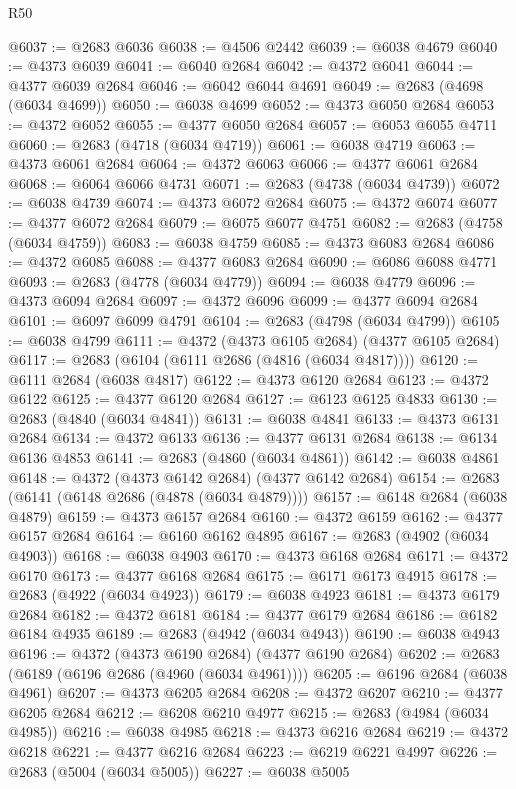 \begin{lexlean}{R50}
\begin{coremodule}
@6037 := @2683 @6036
@6038 := @4506 @2442
@6039 := @6038 @4679
@6040 := @4373 @6039
@6041 := @6040 @2684
@6042 := @4372 @6041
@6044 := @4377 @6039 @2684
@6046 := @6042 @6044 @4691
@6049 := @2683 (@4698 (@6034 @4699))
@6050 := @6038 @4699
@6052 := @4373 @6050 @2684
@6053 := @4372 @6052
@6055 := @4377 @6050 @2684
@6057 := @6053 @6055 @4711
@6060 := @2683 (@4718 (@6034 @4719))
@6061 := @6038 @4719
@6063 := @4373 @6061 @2684
@6064 := @4372 @6063
@6066 := @4377 @6061 @2684
@6068 := @6064 @6066 @4731
@6071 := @2683 (@4738 (@6034 @4739))
@6072 := @6038 @4739
@6074 := @4373 @6072 @2684
@6075 := @4372 @6074
@6077 := @4377 @6072 @2684
@6079 := @6075 @6077 @4751
@6082 := @2683 (@4758 (@6034 @4759))
@6083 := @6038 @4759
@6085 := @4373 @6083 @2684
@6086 := @4372 @6085
@6088 := @4377 @6083 @2684
@6090 := @6086 @6088 @4771
@6093 := @2683 (@4778 (@6034 @4779))
@6094 := @6038 @4779
@6096 := @4373 @6094 @2684
@6097 := @4372 @6096
@6099 := @4377 @6094 @2684
@6101 := @6097 @6099 @4791
@6104 := @2683 (@4798 (@6034 @4799))
@6105 := @6038 @4799
@6111 := @4372 (@4373 @6105 @2684) (@4377 @6105 @2684)
@6117 := @2683 (@6104 (@6111 @2686 (@4816 (@6034 @4817))))
@6120 := @6111 @2684 (@6038 @4817)
@6122 := @4373 @6120 @2684
@6123 := @4372 @6122
@6125 := @4377 @6120 @2684
@6127 := @6123 @6125 @4833
@6130 := @2683 (@4840 (@6034 @4841))
@6131 := @6038 @4841
@6133 := @4373 @6131 @2684
@6134 := @4372 @6133
@6136 := @4377 @6131 @2684
@6138 := @6134 @6136 @4853
@6141 := @2683 (@4860 (@6034 @4861))
@6142 := @6038 @4861
@6148 := @4372 (@4373 @6142 @2684) (@4377 @6142 @2684)
@6154 := @2683 (@6141 (@6148 @2686 (@4878 (@6034 @4879))))
@6157 := @6148 @2684 (@6038 @4879)
@6159 := @4373 @6157 @2684
@6160 := @4372 @6159
@6162 := @4377 @6157 @2684
@6164 := @6160 @6162 @4895
@6167 := @2683 (@4902 (@6034 @4903))
@6168 := @6038 @4903
@6170 := @4373 @6168 @2684
@6171 := @4372 @6170
@6173 := @4377 @6168 @2684
@6175 := @6171 @6173 @4915
@6178 := @2683 (@4922 (@6034 @4923))
@6179 := @6038 @4923
@6181 := @4373 @6179 @2684
@6182 := @4372 @6181
@6184 := @4377 @6179 @2684
@6186 := @6182 @6184 @4935
@6189 := @2683 (@4942 (@6034 @4943))
@6190 := @6038 @4943
@6196 := @4372 (@4373 @6190 @2684) (@4377 @6190 @2684)
@6202 := @2683 (@6189 (@6196 @2686 (@4960 (@6034 @4961))))
@6205 := @6196 @2684 (@6038 @4961)
@6207 := @4373 @6205 @2684
@6208 := @4372 @6207
@6210 := @4377 @6205 @2684
@6212 := @6208 @6210 @4977
@6215 := @2683 (@4984 (@6034 @4985))
@6216 := @6038 @4985
@6218 := @4373 @6216 @2684
@6219 := @4372 @6218
@6221 := @4377 @6216 @2684
@6223 := @6219 @6221 @4997
@6226 := @2683 (@5004 (@6034 @5005))
@6227 := @6038 @5005

\end{coremodule}
\end{lexlean}
